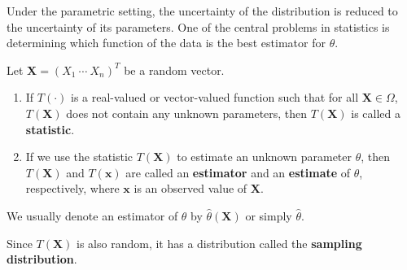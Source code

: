 \documentclass{huhtakm-template-book-v2}
\begin{document}
    Under the parametric setting, the uncertainty of the distribution is reduced to the uncertainty of its parameters. One of the central problems in statistics is determining which function of the data is the best estimator for $\theta$.
    \begin{defn}
        Let $\mathbf{X}=(X_{1}\ \cdots\ X_{n})^{T}$ be a random vector.
        \begin{enumerate}
            \item If $T(\cdot)$ is a real-valued or vector-valued function such that for all $\mathbf{X}\in\Omega$, $T(\mathbf{X})$ does not contain any unknown parameters, then $T(\mathbf{X})$ is called a \textbf{statistic}.
            \item If we use the statistic $T(\mathbf{X})$ to estimate an unknown parameter $\theta$, then $T(\mathbf{X})$ and $T(\mathbf{x})$ are called an \textbf{estimator} and an \textbf{estimate} of $\theta$, respectively, where $\mathbf{x}$ is an observed value of $\mathbf{X}$.
        \end{enumerate}
    \end{defn}
    \begin{rem}
        We usually denote an estimator of $\theta$ by $\hat{\theta}(\mathbf{X})$ or simply $\hat{\theta}$.
    \end{rem}
    \begin{rem}
        Since $T(\mathbf{X})$ is also random, it has a distribution called the \textbf{sampling distribution}.
    \end{rem}
\end{document}
